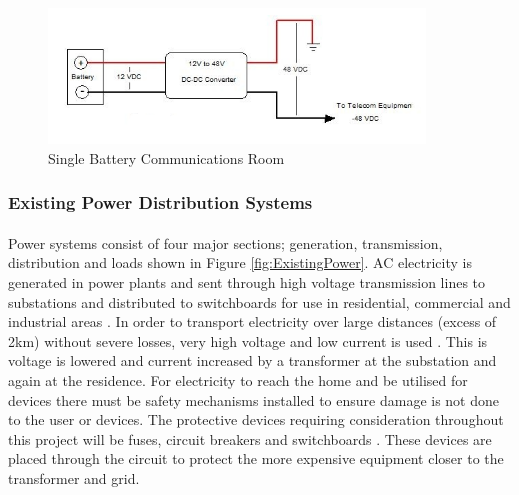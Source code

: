 \begin{figure}[H]
\hfill\includegraphics[width = 100mm]{images/12V_Telecomms.png}\hspace*{\fill}
\caption{Single Battery Communications Room \cite{website:48VTelecomms}}
\label{fig:48VTelecomms}
\end{figure}   

\subsubsection{Existing Power Distribution Systems}

\paragraph{}
Power systems consist of four major sections; generation, transmission, distribution and loads shown in Figure \ref{fig:ExistingPower}. AC electricity is generated in power plants and sent through high voltage transmission lines to substations and distributed to switchboards for use in residential, commercial and industrial areas \cite{Amin2011}. In order to transport electricity over large distances (excess of 2km) without severe losses, very high voltage and low current is used \cite{Amin2011}. This is voltage is lowered and current increased by a transformer at the substation and again at the residence. For electricity to reach the home and be utilised for devices there must be safety mechanisms installed to ensure damage is not done to the user or devices. The protective devices requiring consideration throughout this project will be fuses, circuit breakers and switchboards \cite{UnitedStatesDepartmentoftheInterior2000}. These devices are placed through the circuit to protect the more expensive equipment closer to the transformer and grid.  

